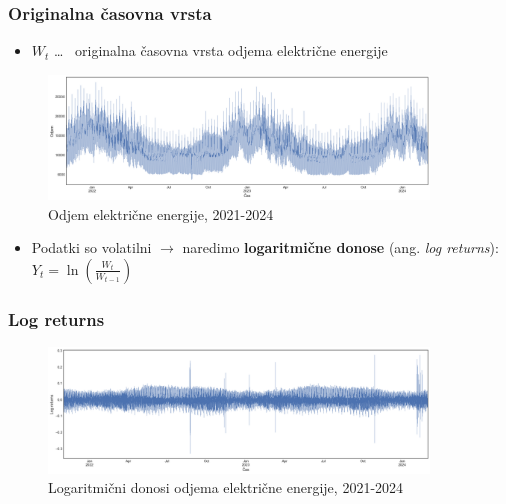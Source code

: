 \documentclass[14p, hyperref={unicode}]{beamer}
\begin{document}
\begin{frame}
    
    \frametitle{Originalna časovna vrsta} 

    \begin{itemize}
        \item $W_t$ \dots~ originalna časovna vrsta odjema električne energije
    \end{itemize}

    \begin{figure}[h!]
        \centering
        \caption{Odjem električne energije, 2021-2024}\par\medskip
        \includegraphics[width=0.9\textwidth]{odjem_EE.png}
    \end{figure}

    \begin{itemize}
        \item Podatki so volatilni $\rightarrow$ naredimo \textbf{logaritmične donose} 
        (ang. \emph{log returns}): $ Y_t = \ln \left( \frac{W_t}{W_{t-1}} \right) $
    \end{itemize}



\end{frame}




\begin{frame}
    
    \frametitle{Log returns} 

    \begin{figure}[h!]
        \centering
        \caption{Logaritmični donosi odjema električne energije, 2021-2024}\par\medskip
        \label{fig:log_returns}
        \includegraphics[width=0.9\textwidth]{log_returns.png}
    \end{figure}

\end{frame}
\end{document}
